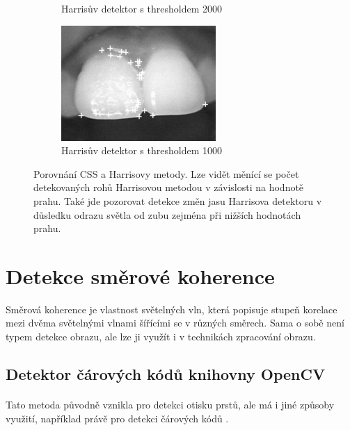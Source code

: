 \begin{figure}[h]
\begin{subfigure}{0.45\textwidth}
    \caption{Harrisův detektor s thresholdem 2000}
    \end{subfigure}
    \begin{subfigure}{0.45\textwidth}
    \includegraphics[width=0.9\linewidth]{obrazky-figures/harris3.png}\hfill
    \caption{Harrisův detektor s thresholdem 1000}
    \end{subfigure}
    \caption{Porovnání CSS a Harrisovy metody. Lze vidět měnící se počet detekovaných rohů Harrisovou metodou v závislosti na hodnotě prahu. Také jde pozorovat detekce změn jasu Harrisova detektoru v důsledku odrazu světla od zubu zejména při nižších hodnotách prahu\protect\footnotemark{}.}
    \label{css_harris}
\end{figure}


\section{Detekce směrové koherence}
Směrová koherence je vlastnost světelných vln, která popisuje stupeň korelace mezi dvěma světelnými vlnami šířícími se v různých směrech. Sama o sobě není typem detekce obrazu, ale lze ji využít i v technikách zpracování obrazu\cite{kim2017directional}.


\subsection*{Detektor čárových kódů knihovny OpenCV}
\label{opencv}
\paragraph{}Tato metoda původně vznikla pro detekci otisku prstů, ale má i jiné způsoby využití, například právě pro detekci čárových kódů \cite{opencv_barcode}. 

